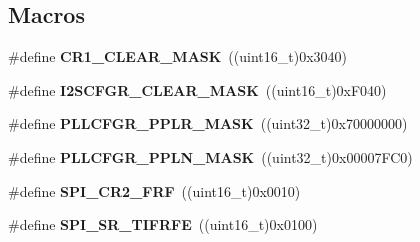 \subsection*{Macros}
\begin{DoxyCompactItemize}
\item 
\hypertarget{group___s_p_i_ga8d425258898b4af4ebc820f52635fad8}{\#define {\bfseries C\-R1\-\_\-\-C\-L\-E\-A\-R\-\_\-\-M\-A\-S\-K}~((uint16\-\_\-t)0x3040)}\label{group___s_p_i_ga8d425258898b4af4ebc820f52635fad8}

\item 
\hypertarget{group___s_p_i_ga441f8283b9c46535e05ae7e520728033}{\#define {\bfseries I2\-S\-C\-F\-G\-R\-\_\-\-C\-L\-E\-A\-R\-\_\-\-M\-A\-S\-K}~((uint16\-\_\-t)0x\-F040)}\label{group___s_p_i_ga441f8283b9c46535e05ae7e520728033}

\item 
\hypertarget{group___s_p_i_ga7fb18a9c4bcfc2b92c8c58f6bfe99876}{\#define {\bfseries P\-L\-L\-C\-F\-G\-R\-\_\-\-P\-P\-L\-R\-\_\-\-M\-A\-S\-K}~((uint32\-\_\-t)0x70000000)}\label{group___s_p_i_ga7fb18a9c4bcfc2b92c8c58f6bfe99876}

\item 
\hypertarget{group___s_p_i_ga7c3555ba01e070847f1475d2578332ed}{\#define {\bfseries P\-L\-L\-C\-F\-G\-R\-\_\-\-P\-P\-L\-N\-\_\-\-M\-A\-S\-K}~((uint32\-\_\-t)0x00007\-F\-C0)}\label{group___s_p_i_ga7c3555ba01e070847f1475d2578332ed}

\item 
\hypertarget{group___s_p_i_ga09e3f41fa2150831afaac191046087f2}{\#define {\bfseries S\-P\-I\-\_\-\-C\-R2\-\_\-\-F\-R\-F}~((uint16\-\_\-t)0x0010)}\label{group___s_p_i_ga09e3f41fa2150831afaac191046087f2}

\item 
\hypertarget{group___s_p_i_gac2a833b915e27cd63a5fc416d9002472}{\#define {\bfseries S\-P\-I\-\_\-\-S\-R\-\_\-\-T\-I\-F\-R\-F\-E}~((uint16\-\_\-t)0x0100)}\label{group___s_p_i_gac2a833b915e27cd63a5fc416d9002472}

\end{DoxyCompactItemize}
